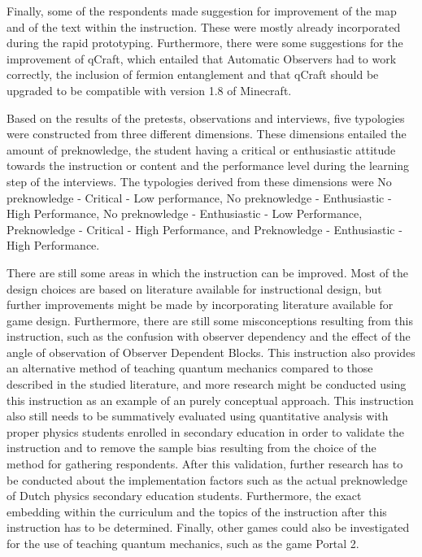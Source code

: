 \documentclass[11pt,twoside]{report} %
\begin{document}
Finally, some of the respondents made suggestion for improvement of the map and of the text within the instruction. These were mostly already incorporated during the rapid prototyping. Furthermore, there were some suggestions for the improvement of qCraft, which entailed that Automatic Observers had to work correctly, the inclusion of fermion entanglement and that qCraft should be upgraded to be compatible with version 1.8 of Minecraft.

Based on the results of the pretests, observations and interviews, five typologies were constructed from three different dimensions. These dimensions entailed the amount of preknowledge, the student having a critical or enthusiastic attitude towards the instruction or content and the performance level during the learning step of the interviews. The typologies derived from these dimensions were No preknowledge - Critical - Low performance, No preknowledge - Enthusiastic - High Performance, No preknowledge - Enthusiastic - Low Performance, Preknowledge - Critical - High Performance, and Preknowledge - Enthusiastic - High Performance.

There are still some areas in which the instruction can be improved. Most of the design choices are based on literature available for instructional design, but further improvements might be made by incorporating literature available for game design. Furthermore, there are still some misconceptions resulting from this instruction, such as the confusion with observer dependency and the effect of the angle of observation of Observer Dependent Blocks. This instruction also provides an alternative method of teaching quantum mechanics compared to those described in the studied literature, and more research might be conducted using this instruction as an example of an purely conceptual approach. This instruction also still needs to be summatively evaluated using quantitative analysis with proper physics students enrolled in secondary education in order to validate the instruction and to remove the sample bias resulting from the choice of the method for gathering respondents. After this validation, further research has to be conducted about the implementation factors such as the actual preknowledge of Dutch physics secondary education students. Furthermore, the exact embedding within the curriculum and the topics of the instruction after this instruction has to be determined. Finally, other games could also be investigated for the use of teaching quantum mechanics, such as the game Portal 2.
\end{document}
